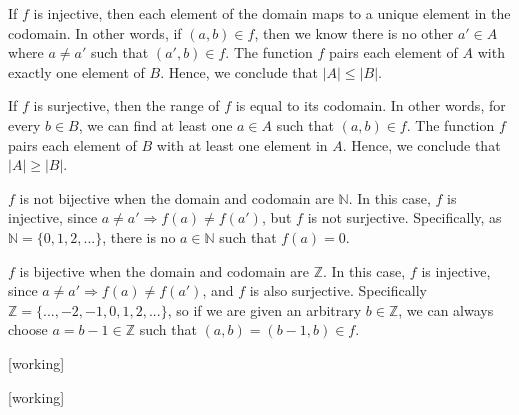 \documentclass[a4paper,12pt]{article}
\begin{document}

If $f$ is injective, then each element of the domain maps to a unique element in the codomain. 
In other words, if $(a,b) \in f$, then we know there is no other $a' \in A$ where $a \ne a'$ such that $(a',b) \in f$. 
The function $f$ pairs each element of $A$ with exactly one element of $B$.
Hence, we conclude that $|A| \le |B|$.

If $f$ is surjective, then the range of $f$ is equal to its codomain. In other words, for every $b \in B$, we can 
find at least one $a \in A$ such that $(a,b) \in f$. The function $f$ pairs each element of $B$ with at least 
one element in $A$. Hence, we conclude that $|A| \ge |B|$.

\vspace{5mm}

$f$ is not bijective when the domain and codomain are $\mathbb{N}$. In this case, $f$ is injective, since $a \ne a' \Rightarrow f(a) \ne f(a')$, but 
$f$ is not surjective. Specifically, as $\mathbb{N} = \{0, 1, 2, ...\}$, there is no $a \in \mathbb{N}$ such that $f(a) = 0$.

$f$ is bijective when the domain and codomain are $\mathbb{Z}$. In this case, $f$ is injective, since $a \ne a' \Rightarrow f(a) \ne f(a')$, and $f$ is also surjective. Specifically $\mathbb{Z} = \{..., -2, -1, 0, 1, 2, ...\}$, so if we are given an arbitrary $b \in \mathbb{Z}$, we can always choose
$a = b -1 \in \mathbb{Z}$ such that $(a,b) = (b-1,b) \in f$.

\vspace{5mm}

[working]

\vspace{5mm}

[working]
\end{document}
